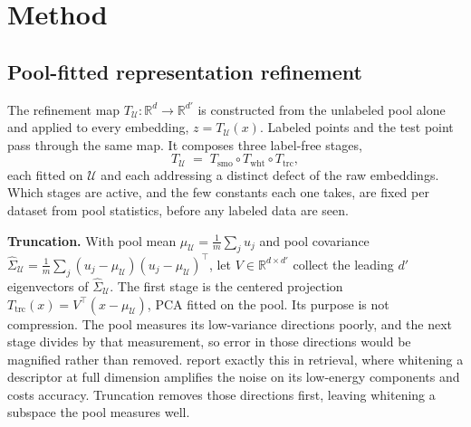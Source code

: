 \section{Method}
\label{sec:method}
\subsection{Pool-fitted representation refinement}
\label{sec:refine}

The refinement map
$T_{\mathcal{U}} : \mathbb{R}^{d} \to \mathbb{R}^{d'}$ is constructed
from the unlabeled pool alone and applied to every embedding,
$z = T_{\mathcal{U}}(x)$. Labeled points and the test point pass
through the same map. It composes three label-free stages,
\begin{equation}
\label{eq:pipeline}
T_{\mathcal{U}} \;=\; T_{\mathrm{smo}} \circ T_{\mathrm{wht}} \circ
T_{\mathrm{trc}} ,
\end{equation}
each fitted on $\mathcal{U}$ and each addressing a distinct defect of
the raw embeddings. Which stages are active, and the few constants each
one takes, are fixed per dataset from pool statistics, before any
labeled data are seen.

\textbf{Truncation.} With pool mean
$\mu_{\mathcal{U}} = \frac{1}{m}\sum_j u_j$ and pool covariance
$\widehat\Sigma_{\mathcal{U}} = \frac{1}{m}\sum_j (u_j -
\mu_{\mathcal{U}})(u_j - \mu_{\mathcal{U}})^{\top}$, let
$V \in \mathbb{R}^{d \times d'}$ collect the leading $d'$ eigenvectors
of $\widehat\Sigma_{\mathcal{U}}$. The first stage is the centered
projection $T_{\mathrm{trc}}(x) = V^{\top}(x - \mu_{\mathcal{U}})$,
PCA fitted on the pool. Its purpose is not compression. The pool measures its low-variance directions poorly, and the next stage divides by that measurement, so error in those directions would be magnified rather than removed. \citet{jegou2012negative} report exactly this in retrieval, where whitening a descriptor at full dimension amplifies the noise on its low-energy components and costs accuracy. Truncation removes those directions first, leaving whitening a subspace the pool measures well.

